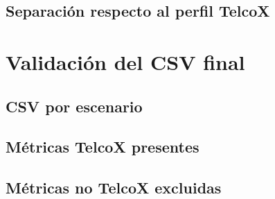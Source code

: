 \subsection{Separación respecto al perfil TelcoX}
\label{subsec:separacion-perfil-telcox}


\section{Validación del CSV final}
\label{sec:validacion-csv-final}

\subsection{CSV por escenario}
\label{subsec:csv-por-escenario}

\subsection{Métricas TelcoX presentes}
\label{subsec:metricas-telcox-presentes}

\subsection{Métricas no TelcoX excluidas}
\label{subsec:metricas-no-telcox-excluidas}